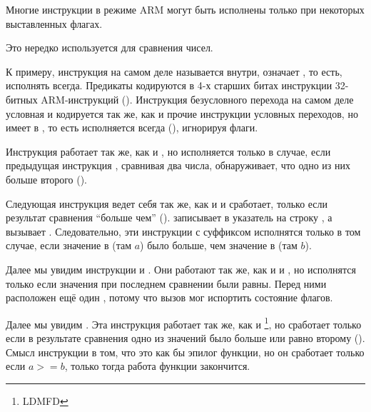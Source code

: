 \label{subsec:jcc_ARM}

\mysubparagraph{\OptimizingKeilVI (\ARMMode)}



Многие инструкции в режиме ARM могут быть исполнены только при некоторых выставленных флагах.

Это нередко используется для сравнения чисел.

К примеру, инструкция \ADD на самом деле называется  внутри,  означает , то есть, исполнять всегда.
Предикаты кодируются в 4-х старших битах инструкции 32-битных ARM-инструкций ().
Инструкция безусловного перехода  на самом деле условная и кодируется так же, 
как и прочие инструкции условных переходов, но имеет  в , 
то есть исполняется всегда (), игнорируя флаги.

Инструкция  работает так же, как и , но исполняется только в случае,
если предыдущая инструкция \CMP,
сравнивая два числа, обнаруживает, что одно из них больше второго ().

Следующая инструкция  ведет себя так же, как и  и сработает, только если 
результат сравнения ``больше чем'' ().
 записывает в  указатель на строку , а  вызывает \printf.
Следовательно, эти инструкции с суффиксом  исполнятся только в том случае, если значение
в  (там $a$) было больше, чем значение в  (там $b$).

Далее мы увидим инструкции  и .
Они работают так же, как и  и , но исполнятся только если значения при последнем сравнении были равны.
Перед ними расположен ещё один \CMP, потому что вызов \printf мог испортить состояние флагов.

Далее мы увидим . Эта инструкция работает так же, как и \footnote{\ac{LDMFD}}, 
но сработает только если в результате сравнения одно из значений было больше или равно второму ().
Смысл инструкции  
в том, что это как бы эпилог функции, но он сработает только если $a>=b$, только тогда работа 
функции закончится.

